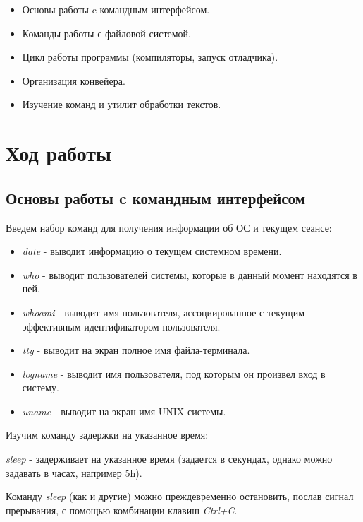 \documentclass[14pt,a4paper,report]{report}
\begin{document}
\begin{itemize}
	\item Основы работы c командным интерфейсом.
	\item Команды работы с файловой системой.
	\item Цикл работы программы (компиляторы, запуск отладчика).
	\item Организация конвейера.
	\item Изучение команд и утилит обработки текстов.
\end{itemize}

\section{Ход работы}

\subsection{Основы работы c командным интерфейсом}

Введем набор команд для получения информации об ОС и текущем сеансе:



\begin{itemize}
	\item \emph{date} - выводит информацию о текущем системном времени.
	\item \emph{who} - выводит пользователей системы, которые в данный момент находятся в ней.
	\item \emph{whoami} - выводит имя пользователя, ассоциированное с текущим эффективным идентификатором пользователя.
	\item \emph{tty} - выводит на экран полное имя файла-терминала.
	\item \emph{logname} - выводит имя пользователя, под которым он произвел вход в систему.
	\item \emph{uname} - выводит на экран имя UNIX-системы. 
\end{itemize}

\clearpage

Изучим команду задержки на указанное время:



\emph{sleep} - задерживает на указанное время (задается в секундах, однако можно задавать в часах, например 5h).

Команду \emph{sleep} (как и другие) можно преждевременно остановить, послав сигнал прерывания, с помощью комбинации клавиш \emph{Ctrl+C}.
\end{document}
